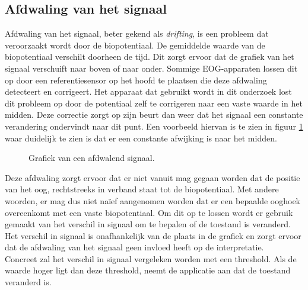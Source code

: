 \documentclass{article}
\newcommand{\figwidth}{0.75\linewidth}
\begin{document}
\subsection{Afdwaling van het signaal}
Afdwaling van het signaal, beter gekend als \textit{drifting}, is een probleem dat veroorzaakt wordt door de biopotentiaal. De gemiddelde waarde van de biopotentiaal verschilt doorheen de tijd. Dit zorgt ervoor dat de grafiek van het signaal verschuift naar boven of naar onder. Sommige EOG-apparaten lossen dit op door een referentiesensor op het hoofd te plaatsen die deze afdwaling detecteert en corrigeert. Het apparaat dat gebruikt wordt in dit onderzoek lost dit probleem op door de potentiaal zelf te corrigeren naar een vaste waarde in het midden. Deze correctie zorgt op zijn beurt dan weer dat het signaal een constante verandering ondervindt naar dit punt. Een voorbeeld hiervan is te zien in figuur \ref{fig:drifting} waar duidelijk te zien is dat er een constante afwijking is naar het midden.\\
\begin{figure}[H]
	\centering
	\caption{Grafiek van een afdwalend signaal.}
	\label{fig:drifting}
\end{figure}
Deze afdwaling zorgt ervoor dat er niet vanuit mag gegaan worden dat de positie van het oog, rechtstreeks in verband staat tot de biopotentiaal. Met andere woorden, er mag dus niet na\"ief aangenomen worden dat er een bepaalde ooghoek overeenkomt met een vaste biopotentiaal. Om dit op te lossen wordt er gebruik gemaakt van het verschil in signaal om te bepalen of de toestand is veranderd. Het verschil in signaal is onafhankelijk van de plaats in de grafiek en zorgt ervoor dat de afdwaling van het signaal geen invloed heeft op de interpretatie. \\ Concreet zal het verschil in signaal vergeleken worden met een threshold. Als de waarde hoger ligt dan deze threshold, neemt de applicatie aan dat de toestand veranderd is.\\
\end{document}
